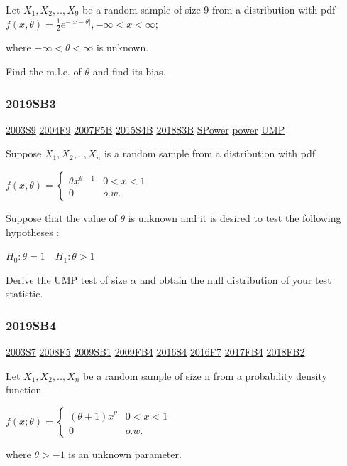 \documentclass[6pt,twocolumn,Portrait]{article}
\begin{document}
Let \(X_1,X_2,..,X_9\) be a random sample of size 9 from a distribution
with pdf \(f(x,\theta) =\frac12e^{-|x-\theta|}, -\infty<x<\infty\);

where \(-\infty<\theta<\infty\) is unknown.

Find the m.l.e. of \(\theta\) and find its bias.

\hypertarget{sb3-3}{%
\subsubsection{2019SB3}\label{sb3-3}}

\protect\hyperlink{s9}{2003S9} \protect\hyperlink{f9-2}{2004F9}
\protect\hyperlink{f5b}{2007F5B} \protect\hyperlink{s4b-1}{2015S4B}
\protect\hyperlink{s3b-2}{2018S3B} \protect\hyperlink{SPower}{SPower}
\protect\hyperlink{power}{power} \protect\hyperlink{UMP}{UMP}

Suppose \(X_1,X_2,..,X_n\) is a random sample from a distribution with
pdf

\(f(x,\theta)=\begin{cases}\theta x^{\theta-1}& 0<x<1\\0& o.w.\end{cases}\)

Suppose that the value of \(\theta\) is unknown and it is desired to
test the following hypotheses :

\(H_0:\theta=1\quad H_1 :\theta>1\)

Derive the UMP test of size \(\alpha\) and obtain the null distribution
of your test statistic.

\hypertarget{sb4-2}{%
\subsubsection{2019SB4}\label{sb4-2}}

\protect\hyperlink{s7}{2003S7} \protect\hyperlink{f5-3}{2008F5}
\protect\hyperlink{sb1}{2009SB1} \protect\hyperlink{fb4}{2009FB4}
\protect\hyperlink{s4-4}{2016S4} \protect\hyperlink{f7-5}{2016F7}
\protect\hyperlink{fb4-3}{2017FB4} \protect\hyperlink{fb2-4}{2018FB2}

Let \(X_1,X_2,..,X_n\) be a random sample of size n from a probability
density function

\(f(x;\theta)=\begin{cases}(\theta+1)x^\theta& 0<x<1\\0& o.w.\end{cases}\)

where \(\theta>-1\) is an unknown parameter.
\end{document}

